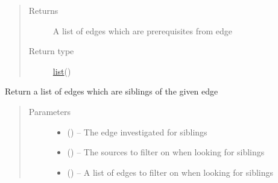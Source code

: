 \documentclass[letterpaper,10pt,english]{sphinxmanual}
\begin{document}
\begin{fulllineitems}
\begin{fulllineitems}
\begin{quote}
\begin{description}
\begin{itemize}
\end{itemize}

\item[{Returns}] \leavevmode
A list of edges which are prerequisites from edge

\item[{Return type}] \leavevmode
\href{https://docs.python.org/2/library/functions.html\#list}{list}({\hyperref[\detokenize{edge:module-edge}]{}})

\end{description}\end{quote}

\end{fulllineitems}


\begin{fulllineitems}
\label{\detokenize{concept_map:concept_map.ConceptMap.find_siblings}}
Return a list of edges which are siblings of the given edge
\begin{quote}\begin{description}
\item[{Parameters}] \leavevmode\begin{itemize}
\item {} 
 ({\hyperref[\detokenize{edge:edge.Edge}]{}}) -- The edge investigated for siblings

\item {} 
 (\href{https://docs.python.org/2/library/functions.html\#list}{}\sphinxstyleliteralemphasis{(}\href{https://docs.python.org/2/library/string.html\#module-string}{}\sphinxstyleliteralemphasis{)}\sphinxstyleliteralemphasis{}) -- The sources to filter on when looking for siblings

\item {} 
 (\href{https://docs.python.org/2/library/functions.html\#list}{}\sphinxstyleliteralemphasis{)}\sphinxstyleliteralemphasis{}) -- A list of edges to filter on when looking for siblings


\end{itemize}
\end{description}
\end{quote}
\end{fulllineitems}
\end{fulllineitems}
\end{document}

